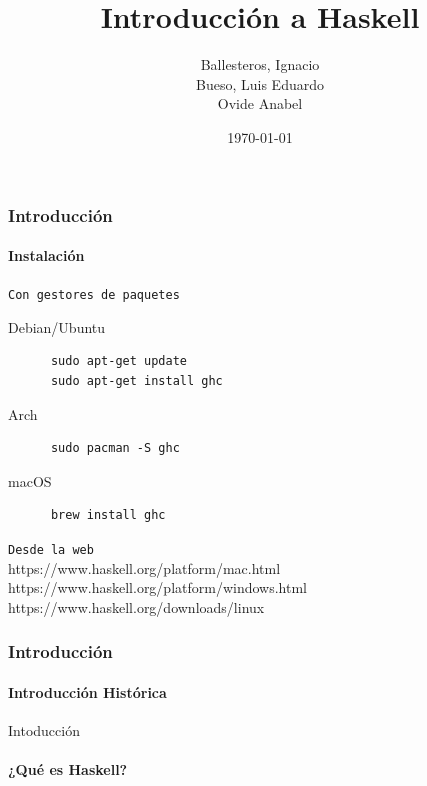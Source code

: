 \documentclass{beamer}
\title{Introducción a Haskell}
\subtitle{}
\date{\today}
\author{Ballesteros, Ignacio\\Bueso, Luis Eduardo\\Ovide Anabel}
\institute{\url{https://github.com/edububa/haskell_course}}
\begin{document}
\maketitle


\begin{frame}[fragile]
  \frametitle{Introducción}
  \framesubtitle{Instalación}

  \texttt{Con gestores de paquetes}

  \begin{block}{Debian/Ubuntu}
    \begin{verbatim}
      sudo apt-get update
      sudo apt-get install ghc
    \end{verbatim}
  \end{block}

  \begin{block}{Arch}
    \begin{verbatim}
      sudo pacman -S ghc
    \end{verbatim}
  \end{block}

  \begin{block}{macOS}
    \begin{verbatim}
      brew install ghc
    \end{verbatim}
  \end{block}

  \texttt{Desde la web}\\
  https://www.haskell.org/platform/mac.html\\
  https://www.haskell.org/platform/windows.html\\
  https://www.haskell.org/downloads/linux

\end{frame}

\begin{frame}[fragile]          %
  \frametitle{Introducción}
  \framesubtitle{Introducción Histórica}

\end{frame}

\begin{frame}{Intoducción}      %
  \framesubtitle{¿Qué es Haskell?}

\end{frame}

\end{document}

